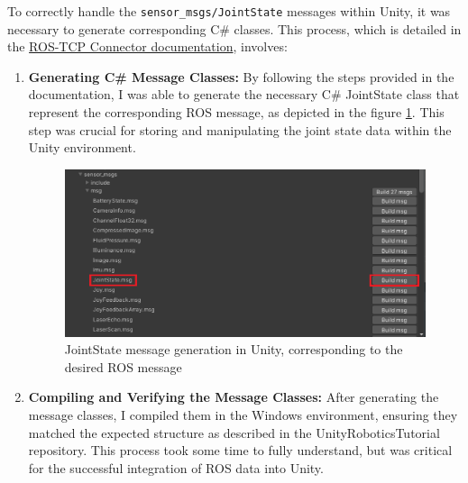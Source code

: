     To correctly handle the \texttt{sensor\_msgs/JointState} messages within Unity, it was necessary to generate corresponding C\# classes. This process, which is detailed in the \href{https://github.com/Unity-Technologies/ROS-TCP-Connector/blob/main/MessageGeneration.md}{ROS-TCP Connector documentation}, involves:
    \begin{enumerate}
        \item \textbf{Generating C\# Message Classes:} By following the steps provided in the documentation, I was able to generate the necessary C\# JointState class that represent the corresponding ROS message, as depicted in the figure \ref{fig:unityjoint_state_message}. This step was crucial for storing and manipulating the joint state data within the Unity environment.
        \begin{figure}
        \centering
        \includegraphics[width=0.75\linewidth]{figs/unityjoint_state_message.png}
        \caption{JointState message generation in Unity, corresponding to the desired ROS message}
        \label{fig:unityjoint_state_message}
        \end{figure}
        \item \textbf{Compiling and Verifying the Message Classes:} After generating the message classes, I compiled them in the Windows environment, ensuring they matched the expected structure as described in the UnityRoboticsTutorial repository. This process took some time to fully understand, but was critical for the successful integration of ROS data into Unity.
    \end{enumerate}